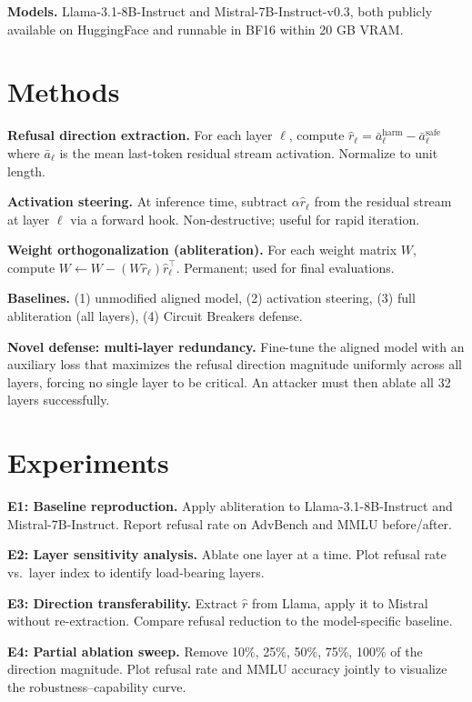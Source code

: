 \documentclass[11pt]{article}
\begin{document}
\textbf{Models.} Llama-3.1-8B-Instruct and Mistral-7B-Instruct-v0.3, both
publicly available on HuggingFace and runnable in BF16 within 20 GB
VRAM.

\section{Methods}\label{methods}

\textbf{Refusal direction extraction.} For each layer \(\ell\), compute
\(\hat{r}_\ell = \bar{a}_\ell^{\text{harm}} - \bar{a}_\ell^{\text{safe}}\)
where \(\bar{a}_\ell\) is the mean last-token residual stream activation.
Normalize to unit length.

\textbf{Activation steering.} At inference time, subtract
\(\alpha \hat{r}_\ell\) from the residual stream at layer \(\ell\) via a
forward hook. Non-destructive; useful for rapid iteration.

\textbf{Weight orthogonalization (abliteration).} For each weight matrix \(W\),
compute \(W \leftarrow W - (W\hat{r}_\ell)\hat{r}_\ell^\top\). Permanent;
used for final evaluations.

\textbf{Baselines.} (1) unmodified aligned model, (2) activation steering,
(3) full abliteration (all layers), (4) Circuit Breakers defense.

\textbf{Novel defense: multi-layer redundancy.} Fine-tune the aligned model
with an auxiliary loss that maximizes the refusal direction magnitude
uniformly across all layers, forcing no single layer to be critical. An
attacker must then ablate all 32 layers successfully.

\section{Experiments}\label{experiments}

\textbf{E1: Baseline reproduction.} Apply abliteration to
Llama-3.1-8B-Instruct and Mistral-7B-Instruct. Report refusal rate on
AdvBench and MMLU before/after.

\textbf{E2: Layer sensitivity analysis.} Ablate one layer at a time. Plot
refusal rate vs.~layer index to identify load-bearing layers.

\textbf{E3: Direction transferability.} Extract \(\hat{r}\) from Llama, apply
it to Mistral without re-extraction. Compare refusal reduction to the
model-specific baseline.

\textbf{E4: Partial ablation sweep.} Remove 10\%, 25\%, 50\%, 75\%, 100\% of the
direction magnitude. Plot refusal rate and MMLU accuracy jointly to
visualize the robustness--capability curve.
\end{document}
